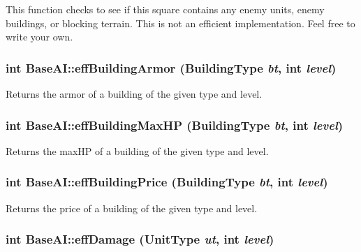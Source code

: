 This function checks to see if this square contains any enemy units, enemy buildings, or blocking terrain. This is not an efficient implementation. Feel free to write your own. \hypertarget{classBaseAI_1de8bdc9274ca62632b9fb7caf55800e}{
\subsubsection[{effBuildingArmor}]{\setlength{\rightskip}{0pt plus 5cm}int BaseAI::effBuildingArmor ({\bf BuildingType} {\em bt}, \/  int {\em level})}}
\label{classBaseAI_1de8bdc9274ca62632b9fb7caf55800e}


Returns the armor of a building of the given type and level. \hypertarget{classBaseAI_2f6a6c6f1da75c203de7e1b1abe7bed1}{
\subsubsection[{effBuildingMaxHP}]{\setlength{\rightskip}{0pt plus 5cm}int BaseAI::effBuildingMaxHP ({\bf BuildingType} {\em bt}, \/  int {\em level})}}
\label{classBaseAI_2f6a6c6f1da75c203de7e1b1abe7bed1}


Returns the maxHP of a building of the given type and level. \hypertarget{classBaseAI_d49ab218e79412c1ce975159688e6cfd}{
\subsubsection[{effBuildingPrice}]{\setlength{\rightskip}{0pt plus 5cm}int BaseAI::effBuildingPrice ({\bf BuildingType} {\em bt}, \/  int {\em level})}}
\label{classBaseAI_d49ab218e79412c1ce975159688e6cfd}


Returns the price of a building of the given type and level. \hypertarget{classBaseAI_0643622ad827a6ad035bf84dfdfacd55}{
\subsubsection[{effDamage}]{\setlength{\rightskip}{0pt plus 5cm}int BaseAI::effDamage ({\bf UnitType} {\em ut}, \/  int {\em level})}}
\label{classBaseAI_0643622ad827a6ad035bf84dfdfacd55}


